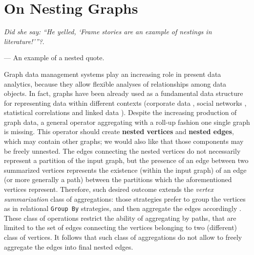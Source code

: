 \chapter{On Nesting Graphs}\label{cha:nesting}

\epigraph{\textit{Did she say: ``He yelled, \lq Frame stories are an example of nestings in literature!\rq\;''?}.}{--- An example of a nested quote.}

Graph data management systems play an increasing role in present data analytics, because they allow flexible analyses of relationships among data objects. In fact, graphs have been already used as a fundamental data structure for representing data within different contexts (corporate data \cite{success,Park2016355}, social networks \cite{xie,BrodkaK14}, statistical correlations \cite{StatisticalModels} and linked data \cite{Vasilyeva13,BarabucciEARMARK}). Despite the increasing production of graph data, a general operator aggregating with a roll-up fashion one single graph is missing. This operator should create \textbf{nested vertices} and \textbf{nested edges}, which may contain other graphs; we would also like that those components may be freely unnested. The edges connecting the nested vertices do not necessarily represent a partition of the input graph, but the presence of an edge between two summarized vertices represents the existence (within the input graph) of an edge (or more generally a path) between the partitions which the aforementioned vertices represent. Therefore, such desired outcome extends the \textit{vertex summarization} class of aggregations: those strategies prefer to group the vertices as in relational \texttt{Group By} strategies, and then aggregate the edges accordingly \cite{JunghannsPR17}. These class of operations restrict the ability of aggregating by paths, that are limited to the set of edges connecting the vertices belonging to two (different) class of vertices. It follows that such class of aggregations   do not allow to freely aggregate the edges into final nested edges. 


